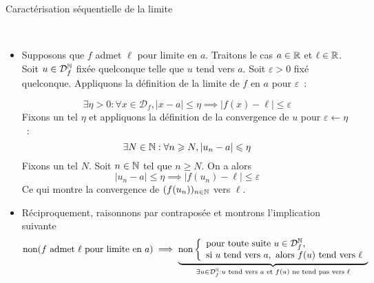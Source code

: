 \documentclass{article}
\begin{document}
\begin{question_kholle}{Caractérisation séquentielle de la limite}

	\hfill\\
	\begin{itemize}[label=$\star$]
		\item Supposons que $f$ admet $\ell$ pour limite en $a$. Traitons le cas $a \in \mathbb R$ et $\ell \in \mathbb R$.
		      Soit $u \in \mathcal{D}_{f}^{\mathbb N}$ fixée quelconque telle que $u$ tend vers $a$.
		      Soit $\varepsilon>0$ fixé quelconque. Appliquons la définition de la limite de $f$ en $a$ pour $\varepsilon$~:

		      $$
			      \exists \eta >0 : \forall x \in \mathcal{D}_{f}, \lvert x - a \rvert \leqslant \eta \implies \lvert f(x) - \ell \rvert  \leqslant \varepsilon
		      $$
		      Fixons un tel $\eta$ et appliquons la définition de la convergence de $u$ pour $\varepsilon \leftarrow \eta$~:
		      $$
			      \exists N \in \mathbb N : \forall n \geqslant N, \lvert u_{n} - a \rvert  \leqslant \eta
		      $$
		      Fixons un tel $N$.
		      Soit $n \in \mathbb N$ tel que $n \geqslant N$.
		      On a alors
		      $$
			      \lvert u_{n} - a \rvert  \leqslant \eta \implies \lvert f(u_{n}) - \ell \rvert \leqslant \varepsilon
		      $$
		      Ce qui montre la convergence de $(f(u_{n}))_{n \in \mathbb N}$ vers $\ell$.

		\item Réciproquement, raisonnons par contraposée et montrons l'implication suivante
		      $$
			      \mathrm{non}(f \text{ admet }\ell \text{ pour limite en }a) \implies \underbrace{ \mathrm{non} \left\{ \begin{array}{ll}
					      \text{pour toute suite } u \in \mathcal{D}_{f}^{\mathbb N}, \\
					      \text{si } u \text{ tend vers } a, \text{ alors } f(u) \text{ tend vers } \ell
				      \end{array}\right. }_{ \exists u \in \mathcal{D}_{f}^{\mathbb N} : u \text{ tend vers }a \text{ et } f(u) \text{ ne tend pas vers }\ell }
		      $$


\end{itemize}
\end{question_kholle}
\end{document}

